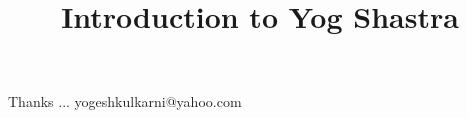\documentclass[xcolor=dvipsnames,compress,t,pdf,9pt]{beamer}
\title[\insertframenumber /\inserttotalframenumber]{Introduction to Yog Shastra}
\begin{document}
	\begin{frame}
	\titlepage
	\end{frame}
	
	
	
	\begin{frame}[c]{}
	Thanks ...
	\vspace{5mm}
	yogeshkulkarni@yahoo.com
	\end{frame}
\end{document}
